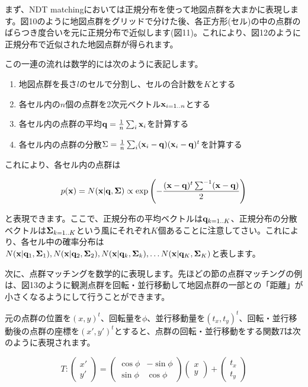 \documentclass[12pt]{article}
\newcommand{\mat}[1] { \mathrm{\bold{#1}} }
\begin{document}
まず、NDT matchingにおいては正規分布を使って地図点群を大まかに表現します。図10のように地図点群をグリッドで分けた後、各正方形(セル)の中の点群のばらつき度合いを元に正規分布で近似します(図11)。これにより、図12のように正規分布で近似された地図点群が得られます。

この一連の流れは数学的には次のように表記します。

\begin{enumerate}
	\item 地図点群を長さ$l$のセルで分割し、セルの合計数を$K$とする
	\item 各セル内の$n$個の点群を2次元ベクトル$\mat{x}_{i=1..n}$とする
	\item 各セル内の点群の平均$\mat{q} = \frac{1}{n} \sum_i  \mat{x}_i$を計算する
	\item 各セル内の点群の分散$\Sigma = \frac{1}{n} \sum_{i}  ( \mat{x}_i - \mat{q} ) ( \mat{x}_i - \mat{q} )^t $を計算する
\end{enumerate}

これにより、各セル内の点群は

\begin{equation}
	p(\mat{x}) = N(\mat{x} | \mat{q}, \mat{\Sigma} )  \propto  \exp{  \left(  - \frac{ (\mat{x} - \mat{q})^t \sum^{-1} (\mat{x} - \mat{q})  }{2}   \right)  } 
\end{equation}

と表現できます。ここで、正規分布の平均ベクトルは$\mat{q}_{k=1..K}$、正規分布の分散ベクトルは$\mat{\Sigma}_{k=1..K}$という風にそれぞれ$K$個あることに注意してさい。これにより、各セル中の確率分布は$N(\mat{x} | \mat{q}_1, \mat{\Sigma}_1 ), \\ N(\mat{x} | \mat{q}_2, \mat{\Sigma}_2 ), N(\mat{x} | \mat{q}_k, \mat{\Sigma}_k ), \dots N(\mat{x} | \mat{q}_K, \mat{\Sigma}_K )$と表します。



次に、点群マッチングを数学的に表現します。先ほどの節の点群マッチングの例は、図13のように観測点群を回転・並行移動して地図点群の一部との「距離」が小さくなるようにして行うことができます。

元の点群の位置を$(x, y)^t$、回転量を$\phi$、並行移動量を$(t_x, t_y)^t$、回転・並行移動後の点群の座標を$(x', y')^t$とすると、点群の回転・並行移動をする関数$T$は次のように表現されます。

\begin{equation}
T : \begin{pmatrix} x' \\ y' \end{pmatrix} = \begin{pmatrix} \cos{\phi} & -\sin{\phi} \\ \sin{\phi} & \cos{\phi} \end{pmatrix} \begin{pmatrix} x \\y \end{pmatrix} + \begin{pmatrix} t_x \\ t_y \end{pmatrix}
\end{equation}
\end{document}
